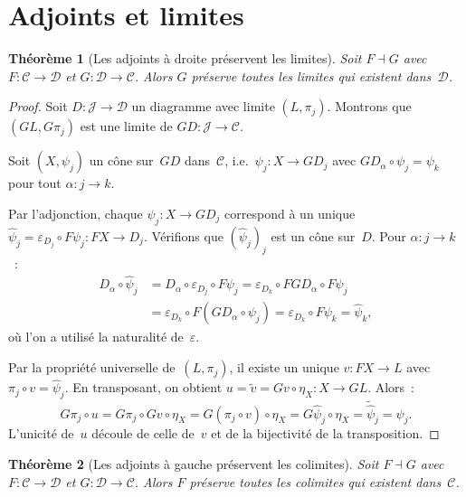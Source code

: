 \documentclass[a4paper,12pt]{book}
\newtheorem{theoreme}{Théorème}[chapter]
\begin{document}
\section{Adjoints et limites}\label{sec:adjoints-limites}

\begin{theoreme}[Les adjoints à droite préservent les limites]\label{thm:rapl}
Soit $F\dashv G$ avec $F\colon\mathcal{C}\to\mathcal{D}$ et
$G\colon\mathcal{D}\to\mathcal{C}$.
Alors $G$ préserve toutes les limites qui existent dans~$\mathcal{D}$.
\end{theoreme}

\begin{proof}
Soit $D\colon\mathcal{J}\to\mathcal{D}$ un diagramme avec limite
$(L,\pi_j)$. Montrons que $(GL,G\pi_j)$ est une limite de
$GD\colon\mathcal{J}\to\mathcal{C}$.

Soit $(X,\psi_j)$ un cône sur~$GD$ dans~$\mathcal{C}$,
i.e.\ $\psi_j\colon X\to GD_j$ avec $GD_\alpha\circ\psi_j=\psi_k$
pour tout $\alpha\colon j\to k$.

Par l'adjonction, chaque $\psi_j\colon X\to GD_j$ correspond à un unique
$\hat{\psi}_j = \varepsilon_{D_j}\circ F\psi_j\colon FX\to D_j$.
Vérifions que $(\hat{\psi}_j)_j$ est un cône sur~$D$.
Pour $\alpha\colon j\to k$~:
\begin{align*}
    D_\alpha\circ\hat{\psi}_j
    &= D_\alpha\circ\varepsilon_{D_j}\circ F\psi_j
    = \varepsilon_{D_k}\circ FGD_\alpha\circ F\psi_j \\
    &= \varepsilon_{D_k}\circ F(GD_\alpha\circ\psi_j)
    = \varepsilon_{D_k}\circ F\psi_k = \hat{\psi}_k,
\end{align*}
où l'on a utilisé la naturalité de~$\varepsilon$.

Par la propriété universelle de~$(L,\pi_j)$, il existe un unique
$v\colon FX\to L$ avec $\pi_j\circ v = \hat{\psi}_j$.
En transposant, on obtient $u = \tilde{v} = Gv\circ\eta_X\colon X\to GL$.
Alors~:
\[
    G\pi_j\circ u = G\pi_j\circ Gv\circ\eta_X
    = G(\pi_j\circ v)\circ\eta_X
    = G\hat{\psi}_j\circ\eta_X
    = \widetilde{\hat{\psi}}_j = \psi_j.
\]
L'unicité de~$u$ découle de celle de~$v$ et de la bijectivité de la transposition.
\end{proof}

\begin{theoreme}[Les adjoints à gauche préservent les colimites]\label{thm:lapc}
Soit $F\dashv G$ avec $F\colon\mathcal{C}\to\mathcal{D}$ et
$G\colon\mathcal{D}\to\mathcal{C}$.
Alors $F$ préserve toutes les colimites qui existent dans~$\mathcal{C}$.
\end{theoreme}
\end{document}
